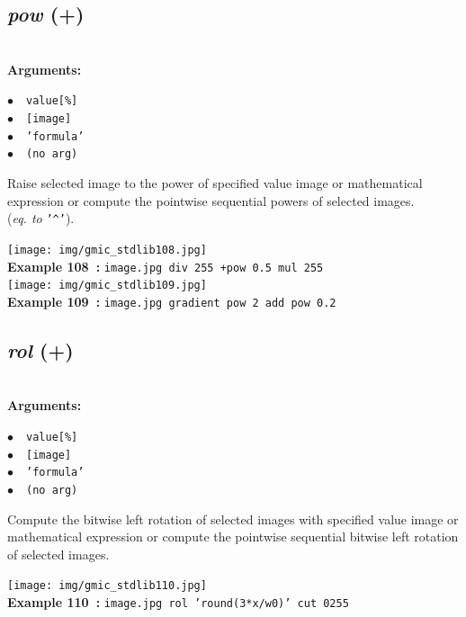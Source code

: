 \documentclass[a4paper,10.5pt,twoside]{book}
\def\comma{\discretionary{,}{}{,}}
\newcommand{\Cb}[1]{\textcolor{cb}{#1}}
\begin{document}
\subsection{\emph{pow} (+)}\vspace*{-0.7em}
~\\\textbf{\Cb{Arguments: }}\begin{flushleft}
{\small \Cb{\hspace*{0.5cm}$\bullet$~~\texttt{value[\%]}}}~~~\\
{\small \Cb{\hspace*{0.5cm}$\bullet$~~\texttt{[image]}}}~~~\\
{\small \Cb{\hspace*{0.5cm}$\bullet$~~\texttt{'formula'}}}~~~\\
{\small \Cb{\hspace*{0.5cm}$\bullet$~~\texttt{(no arg)}}}\end{flushleft}
Raise selected image to the power of specified value{\comma} image or mathematical
expression{\comma} or compute the pointwise sequential powers of selected images.
~\\(\emph{eq. to} {\small \texttt{'\textasciicircum '}}).
\begin{center}\texttt{[image: img/gmic\_stdlib108.jpg]}\\
{\footnotesize \textbf{Example 108~:} \texttt{image.jpg div 255 +pow 0.5 mul 255}}
\\\texttt{[image: img/gmic\_stdlib109.jpg]}\\
{\footnotesize \textbf{Example 109~:} \texttt{image.jpg gradient pow 2 add pow 0.2}}
\end{center}

\subsection{\emph{rol} (+)}\vspace*{-0.7em}
~\\\textbf{\Cb{Arguments: }}\begin{flushleft}
{\small \Cb{\hspace*{0.5cm}$\bullet$~~\texttt{value[\%]}}}~~~\\
{\small \Cb{\hspace*{0.5cm}$\bullet$~~\texttt{[image]}}}~~~\\
{\small \Cb{\hspace*{0.5cm}$\bullet$~~\texttt{'formula'}}}~~~\\
{\small \Cb{\hspace*{0.5cm}$\bullet$~~\texttt{(no arg)}}}\end{flushleft}
Compute the bitwise left rotation of selected images with specified value{\comma} image or
mathematical expression{\comma} or compute the pointwise sequential bitwise left rotation of
selected images.
\begin{center}\texttt{[image: img/gmic\_stdlib110.jpg]}\\
{\footnotesize \textbf{Example 110~:} \texttt{image.jpg rol 'round(3*x/w{\comma}0)' cut 0{\comma}255}}
\end{center}
\end{document}

